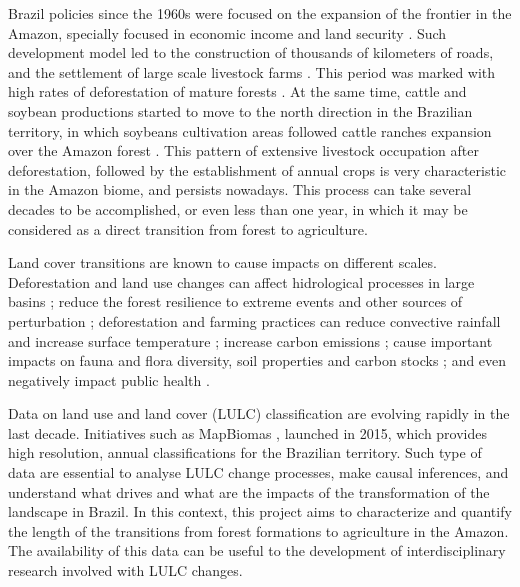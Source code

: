 \documentclass[essd, manuscript]{copernicus}
\begin{document}


\introduction[Introduction]

Brazil policies since the 1960s were focused on the expansion of the frontier in the Amazon, specially focused in economic income and land security \citep{Carvalho2002, Mcdonald2003, Banerjee2009}. Such development model led to the construction of thousands of kilometers of roads, and the settlement of large scale livestock farms \citep{Carvalho2002, Banerjee2009}. This period was marked with high rates of deforestation of mature forests \citep{Fearnside2005}. At the same time, cattle and soybean productions started to move to the north direction in the Brazilian territory, in which soybeans cultivation areas followed cattle ranches expansion over the Amazon forest \citep{Simon2005, Barona2010, Arima2011}.
This pattern of extensive livestock occupation after deforestation, followed by the establishment of annual crops is very characteristic in the Amazon biome, and persists nowadays.
This process can take several decades to be accomplished, or even less than one year, in which it may be considered as a direct transition from forest to agriculture.

Land cover transitions are known to cause impacts on different scales.
Deforestation and land use changes can affect hidrological processes in large basins \citep{Arias2018}; reduce the forest resilience to extreme events and other sources of perturbation \citep{Boulton2022}; deforestation and farming practices can reduce convective rainfall and increase surface temperature \citep{Maeda2021}; increase carbon emissions \citep{Gatti2021}; cause important impacts on fauna and flora diversity, soil properties and carbon stocks \citep{Nunes2022}; and even negatively impact public health \citep{Ellwanger2020}.

Data on land use and land cover (LULC) classification are evolving rapidly in the last decade.
Initiatives such as MapBiomas \citep{Souza2020}, launched in 2015, which provides high resolution, annual classifications for the Brazilian territory.
Such type of data are essential to analyse LULC change processes, make causal inferences, and understand what drives and what are the impacts of the transformation of the landscape in Brazil.
In this context, this project aims to characterize and quantify the length of the transitions from forest formations to agriculture in the Amazon.
The availability of this data can be useful to the development of interdisciplinary research involved with LULC changes.
\end{document}
